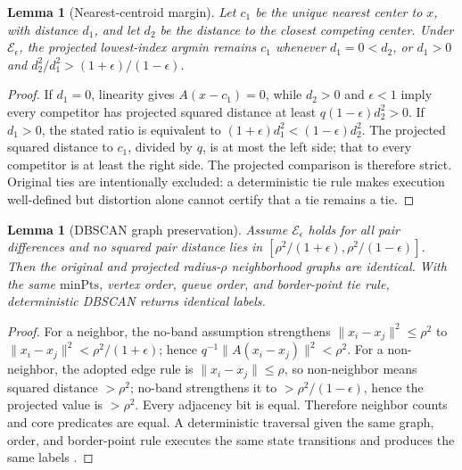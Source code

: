 \documentclass[pdflatex,sn-mathphys-num,iicol]{sn-jnl}
\theoremstyle{plain}
\newtheorem{lemma}[theorem]{Lemma}
\theoremstyle{definition}
\theoremstyle{remark}
\begin{document}
\begin{appendices}
\begin{lemma}[Nearest-centroid margin]\label{lem:margin-a}
Let $c_1$ be the unique nearest center to $x$, with distance $d_1$, and let $d_2$ be the distance to the closest competing center. Under $\mathcal E_\epsilon$, the projected lowest-index argmin remains $c_1$ whenever $d_1=0<d_2$, or $d_1>0$ and $d_2^2/d_1^2>(1+\epsilon)/(1-\epsilon)$.
\end{lemma}
\begin{proof}
If $d_1=0$, linearity gives $A(x-c_1)=0$, while $d_2>0$ and $\epsilon<1$ imply every competitor has projected squared distance at least $q(1-\epsilon)d_2^2>0$. If $d_1>0$, the stated ratio is equivalent to $(1+\epsilon)d_1^2<(1-\epsilon)d_2^2$. The projected squared distance to $c_1$, divided by $q$, is at most the left side; that to every competitor is at least the right side. The projected comparison is therefore strict. Original ties are intentionally excluded: a deterministic tie rule makes execution well-defined but distortion alone cannot certify that a tie remains a tie.
\end{proof}

\begin{lemma}[DBSCAN graph preservation]\label{lem:dbscan-a}
Assume $\mathcal E_\epsilon$ holds for all pair differences and no squared pair distance lies in $[\rho^2/(1+\epsilon),\rho^2/(1-\epsilon)]$. Then the original and projected radius-$\rho$ neighborhood graphs are identical. With the same $\mathrm{minPts}$, vertex order, queue order, and border-point tie rule, deterministic DBSCAN returns identical labels.
\end{lemma}
\begin{proof}
For a neighbor, the no-band assumption strengthens $\|x_i-x_j\|^2\le\rho^2$ to $\|x_i-x_j\|^2<\rho^2/(1+\epsilon)$; hence $q^{-1}\|A(x_i-x_j)\|^2<\rho^2$. For a non-neighbor, the adopted edge rule is $\|x_i-x_j\|\le\rho$, so non-neighbor means squared distance $>\rho^2$; no-band strengthens it to $>\rho^2/(1-\epsilon)$, hence the projected value is $>\rho^2$. Every adjacency bit is equal. Therefore neighbor counts and core predicates are equal. A deterministic traversal given the same graph, order, and border-point rule executes the same state transitions and produces the same labels \cite{ester1996dbscan}.
\end{proof}


\end{appendices}
\end{document}
